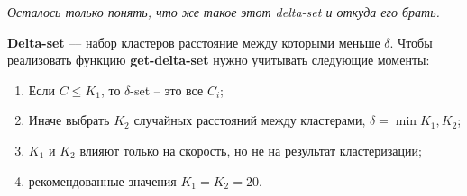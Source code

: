 {\it Осталось только понять, что же такое этот delta-set и откуда его брать.}

{\bf Delta-set} --– набор кластеров расстояние между которыми меньше $\delta$. Чтобы реализовать функцию {\bf get-delta-set} нужно учитывать следующие моменты:
\begin{enumerate}
\item Если $C \le K_1$, то $\delta$-set – это все $C_i$;
\item Иначе выбрать $K_2$ случайных расстояний между кластерами, $\delta = \min{K_1,K_2}$;
\item $K_1$ и $K_2$ влияют только на скорость, но не на результат кластеризации; 
\item рекомендованные значения $K_1 = K_2 = 20$.
\end{enumerate}